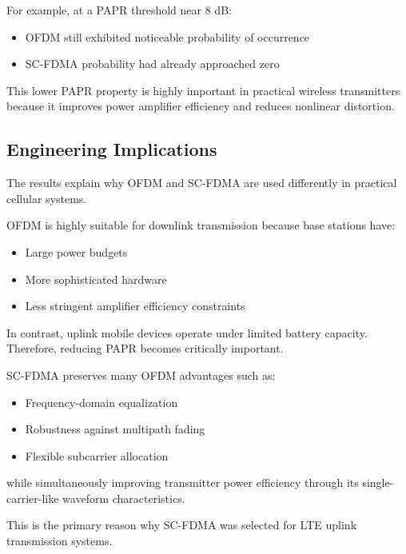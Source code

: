 For example, at a PAPR threshold near 8 dB:

\begin{itemize}
    \item OFDM still exhibited noticeable probability of occurrence
    \item SC-FDMA probability had already approached zero
\end{itemize}

This lower PAPR property is highly important in practical wireless
transmitters because it improves power amplifier efficiency and reduces
nonlinear distortion.

\subsection{Engineering Implications}

The results explain why OFDM and SC-FDMA are used differently in practical
cellular systems.

OFDM is highly suitable for downlink transmission because base stations
have:

\begin{itemize}
    \item Large power budgets
    \item More sophisticated hardware
    \item Less stringent amplifier efficiency constraints
\end{itemize}

In contrast, uplink mobile devices operate under limited battery capacity.
Therefore, reducing PAPR becomes critically important.

SC-FDMA preserves many OFDM advantages such as:

\begin{itemize}
    \item Frequency-domain equalization
    \item Robustness against multipath fading
    \item Flexible subcarrier allocation
\end{itemize}

while simultaneously improving transmitter power efficiency through its
single-carrier-like waveform characteristics.

This is the primary reason why SC-FDMA was selected for LTE uplink
transmission systems.


